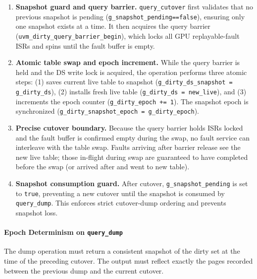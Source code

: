 \begin{enumerate}
    \item \textbf{Snapshot guard and query barrier.}
          \texttt{query\_cutover} first validates that no previous snapshot is
          pending (\texttt{g\_snapshot\_pending==false}), ensuring only one
          snapshot exists at a time. It then acquires the query barrier
          (\texttt{uvm\_dirty\_query\_barrier\_begin}), which locks all GPU
          replayable-fault ISRs and spins until the fault buffer is empty.

    \item \textbf{Atomic table swap and epoch increment.}
          While the query barrier is held and the DS write lock is acquired,
          the operation performs three atomic steps: (1) saves current live
          table to snapshot (\texttt{g\_dirty\_ds\_snapshot = g\_dirty\_ds}),
          (2) installs fresh live table (\texttt{g\_dirty\_ds = new\_live}),
          and (3) increments the epoch counter (\texttt{g\_dirty\_epoch += 1}).
          The snapshot epoch is synchronized (\texttt{g\_dirty\_snapshot\_epoch
          = g\_dirty\_epoch}).

    \item \textbf{Precise cutover boundary.}
          Because the query barrier holds ISRs locked and the fault buffer is
          confirmed empty during the swap, no fault service can interleave with
          the table swap. Faults arriving after barrier release see the new live
          table; those in-flight during swap are guaranteed to have completed
          before the swap (or arrived after and went to new table).

    \item \textbf{Snapshot consumption guard.}
          After cutover, \texttt{g\_snapshot\_pending} is set to \texttt{true},
          preventing a new cutover until the snapshot is consumed by
          \texttt{query\_dump}. This enforces strict cutover-dump ordering and
          prevents snapshot loss.
\end{enumerate}

\vspace{1em}

\paragraph{Epoch Determinism on \texttt{query\_dump}}
The dump operation must return a consistent snapshot of the dirty set at the
time of the preceding cutover. The output must reflect exactly the pages
recorded between the previous dump and the current cutover.

